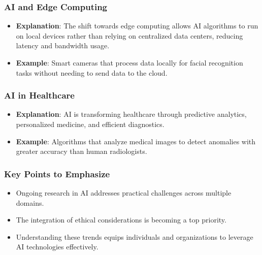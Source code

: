 \documentclass[aspectratio=169]{beamer}
\begin{document}
\begin{frame}[fragile]
    \frametitle{AI and Edge Computing}
    \begin{itemize}
        \item \textbf{Explanation}: The shift towards edge computing allows AI algorithms to run on local devices rather than relying on centralized data centers, reducing latency and bandwidth usage.
        \item \textbf{Example}: Smart cameras that process data locally for facial recognition tasks without needing to send data to the cloud.
    \end{itemize}
\end{frame}

\begin{frame}[fragile]
    \frametitle{AI in Healthcare}
    \begin{itemize}
        \item \textbf{Explanation}: AI is transforming healthcare through predictive analytics, personalized medicine, and efficient diagnostics.
        \item \textbf{Example}: Algorithms that analyze medical images to detect anomalies with greater accuracy than human radiologists.
    \end{itemize}
\end{frame}

\begin{frame}[fragile]
    \frametitle{Key Points to Emphasize}
    \begin{itemize}
        \item Ongoing research in AI addresses practical challenges across multiple domains.
        \item The integration of ethical considerations is becoming a top priority.
        \item Understanding these trends equips individuals and organizations to leverage AI technologies effectively.
    \end{itemize}
\end{frame}
\end{document}
